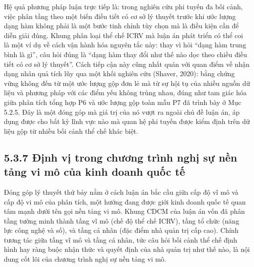 \documentclass[
  a4paper,
  13pt]{extreport}
\begin{document}
Hệ quả phương pháp luận trực tiếp là: trong nghiên cứu phi tuyến đa bối
cảnh, việc phân tầng theo một biến điều tiết có cơ sở lý thuyết trước
khi ước lượng dạng hàm không phải là một bước tinh chỉnh tùy chọn mà là
điều kiện cần để diễn giải đúng. Khung phân loại thể chế ICRV mà luận án
phát triển có thể coi là một ví dụ về cách vận hành hóa nguyên tắc này:
thay vì hỏi ``dạng hàm trung bình là gì'', câu hỏi đúng là ``dạng hàm
thay đổi như thế nào dọc theo chiều điều tiết có cơ sở lý thuyết''. Cách
tiếp cận này cũng nhất quán với quan điểm về nhận dạng nhân quả tích lũy
qua một khối nghiên cứu (Shaver, 2020): bằng chứng vững không đến từ một
ước lượng gộp đơn lẻ mà từ sự hội tụ của nhiều nguồn dữ liệu và phương
pháp với các điểm yếu không trùng nhau, đúng như tam giác hóa giữa phân
tích tổng hợp P6 và ước lượng gộp toàn mẫu P7 đã trình bày ở Mục 5.2.5.
Đây là một đóng góp mà giá trị của nó vượt ra ngoài chủ đề luận án, áp
dụng được cho bất kỳ lĩnh vực nào mà quan hệ phi tuyến được kiểm định
trên dữ liệu gộp từ nhiều bối cảnh thể chế khác biệt.

\hypertarget{ux111ux1ecbnh-vux1ecb-trong-chux1b0ux1a1ng-truxecnh-nghux1ecb-sux1ef1-nux1ec1n-tux1ea3ng-vi-muxf4-cux1ee7a-kinh-doanh-quux1ed1c-tux1ebf}{%
\subsection{5.3.7 Định vị trong chương trình nghị sự nền tảng vi mô của
kinh doanh quốc
tế}\label{ux111ux1ecbnh-vux1ecb-trong-chux1b0ux1a1ng-truxecnh-nghux1ecb-sux1ef1-nux1ec1n-tux1ea3ng-vi-muxf4-cux1ee7a-kinh-doanh-quux1ed1c-tux1ebf}}

Đóng góp lý thuyết thứ bảy nằm ở cách luận án bắc cầu giữa cấp độ vĩ mô
và cấp độ vi mô của phân tích, một hướng đang được giới kinh doanh quốc
tế quan tâm mạnh dưới tên gọi nền tảng vi mô. Khung CDCM của luận án vốn
đã phân tầng tường minh thành tầng vĩ mô (chế độ thể chế ICRV), tầng tổ
chức (năng lực công nghệ và số), và tầng cá nhân (đặc điểm nhà quản trị
cấp cao). Chính tương tác giữa tầng vĩ mô và tầng cá nhân, tức câu hỏi
bối cảnh thể chế định hình hay ràng buộc nhận thức và quyết định của nhà
quản trị như thế nào, là nội dung cốt lõi của chương trình nghị sự nền
tảng vi mô.
\end{document}
